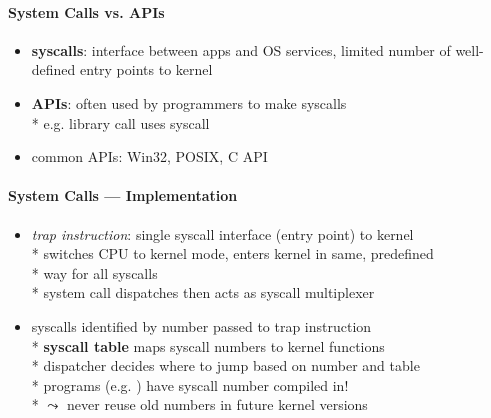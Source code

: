 \paragraph{System Calls vs. APIs}
\begin{itemize}
	\item \textbf{syscalls}: interface between apps and OS services, limited number of well-defined entry points to kernel
	\item \textbf{APIs}: often used by programmers to make syscalls \\*
		e.g.  library call uses  syscall
	\item common APIs: Win32, POSIX, C API
\end{itemize}

\paragraph{System Calls --- Implementation}
\begin{itemize}
	\item \emph{trap instruction}: single syscall interface (entry point) to kernel \\*
		switches CPU to kernel mode, enters kernel in same, predefined \\* \phantom{x} way for all syscalls \\*
		system call dispatches then acts as syscall multiplexer
	\item syscalls identified by number passed to trap instruction \\*
		\textbf{syscall table} maps syscall numbers to kernel functions \\*
		dispatcher decides where to jump based on number and table \\*
		programs (e.g. ) have syscall number compiled in! \\*
		\( \leadsto \) never reuse old numbers in future kernel versions
\end{itemize}


